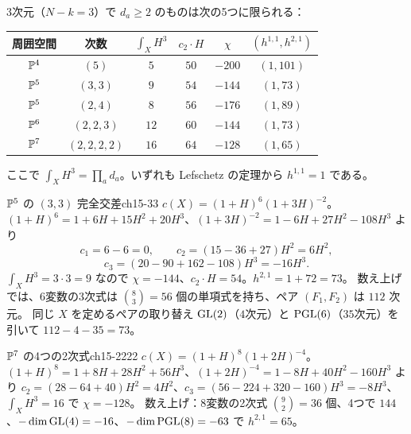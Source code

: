 3次元（$N - k = 3$）で $d_a\ge2$ のものは次の5つに限られる：

\begin{center}
\renewcommand{\arraystretch}{1.3}
\begin{tabular}{c|c|c|c|c|c}
周囲空間 & 次数 & $\int_XH^3$ & $c_2\cdot H$ & $\chi$ & $(h^{1,1},h^{2,1})$ \\ \hline
$\mathbb{P}^4$ & $(5)$ & $5$ & $50$ & $-200$ & $(1,101)$ \\
$\mathbb{P}^5$ & $(3,3)$ & $9$ & $54$ & $-144$ & $(1,73)$ \\
$\mathbb{P}^5$ & $(2,4)$ & $8$ & $56$ & $-176$ & $(1,89)$ \\
$\mathbb{P}^6$ & $(2,2,3)$ & $12$ & $60$ & $-144$ & $(1,73)$ \\
$\mathbb{P}^7$ & $(2,2,2,2)$ & $16$ & $64$ & $-128$ & $(1,65)$ \\
\end{tabular}
\end{center}
ここで $\int_XH^3 = \prod_ad_a$。いずれも Lefschetz の定理から $h^{1,1}=1$ である。

\begin{myex}{$\mathbb{P}^5$ の $(3,3)$ 完全交差}{ch15-33}
$c(X) = (1+H)^6(1+3H)^{-2}$。$(1+H)^6 = 1+6H+15H^2+20H^3$、$(1+3H)^{-2} = 1-6H+27H^2-108H^3$ より
\[
c_1 = 6-6 = 0,\qquad c_2 = (15-36+27)H^2 = 6H^2,
\]
\[
c_3 = (20-90+162-108)H^3 = -16H^3 .
\]
$\int_XH^3 = 3\cdot3 = 9$ なので $\chi = -144$、$c_2\cdot H = 54$。$h^{2,1} = 1+72 = 73$。
数え上げでは、6変数の3次式は $\binom{8}{3} = 56$ 個の単項式を持ち、ペア $(F_1,F_2)$ は $112$ 次元。
同じ $X$ を定めるペアの取り替え $\operatorname{GL}(2)$（$4$次元）と $\operatorname{PGL}(6)$（$35$次元）を引いて $112-4-35 = 73$。
\end{myex}

\begin{myex}{$\mathbb{P}^7$ の4つの2次式}{ch15-2222}
$c(X) = (1+H)^8(1+2H)^{-4}$。$(1+H)^8 = 1+8H+28H^2+56H^3$、$(1+2H)^{-4} = 1-8H+40H^2-160H^3$ より
$c_2 = (28-64+40)H^2 = 4H^2$、$c_3 = (56-224+320-160)H^3 = -8H^3$、$\int_XH^3 = 16$ で $\chi = -128$。
数え上げ：$8$変数の2次式 $\binom{9}{2} = 36$ 個、4つで $144$、$-\dim\operatorname{GL}(4) = -16$、$-\dim\operatorname{PGL}(8) = -63$ で $h^{2,1} = 65$。
\end{myex}

